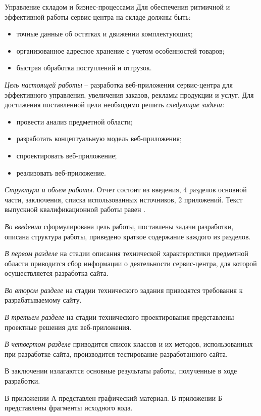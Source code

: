 Управление складом и бизнес-процессами
Для обеспечения ритмичной и эффективной работы сервис-центра на складе должны быть:
\begin{itemize}
\item точные данные об остатках и движении комплектующих;
\item организованное адресное хранение с учетом особенностей товаров;
\item быстрая обработка поступлений и отгрузок.
\end{itemize}

\emph{Цель настоящей работы} – разработка веб-приложения сервис-центра для эффективного управления, увеличения заказов, рекламы продукции и услуг. Для достижения поставленной цели необходимо решить \emph{следующие задачи:}
\begin{itemize}
\item провести анализ предметной области;
\item разработать концептуальную модель веб-приложения;
\item спроектировать веб-приложение;
\item реализовать веб-приложение.
\end{itemize}

\emph{Структура и объем работы.} Отчет состоит из введения, 4 разделов основной части, заключения, списка использованных источников, 2 приложений. Текст выпускной квалификационной работы равен .

\emph{Во введении} сформулирована цель работы, поставлены задачи разработки, описана структура работы, приведено краткое содержание каждого из разделов.

\emph{В первом разделе} на стадии описания технической характеристики предметной области приводится сбор информации о деятельности сервис-центра, для которой осуществляется разработка сайта.

\emph{Во втором разделе} на стадии технического задания приводятся требования к разрабатываемому сайту.

\emph{В третьем разделе} на стадии технического проектирования представлены проектные решения для веб-приложения.

\emph{В четвертом разделе} приводится список классов и их методов, использованных при разработке сайта, производится тестирование разработанного сайта.

В заключении излагаются основные результаты работы, полученные в ходе разработки.

В приложении А представлен графический материал.
В приложении Б представлены фрагменты исходного кода. 
